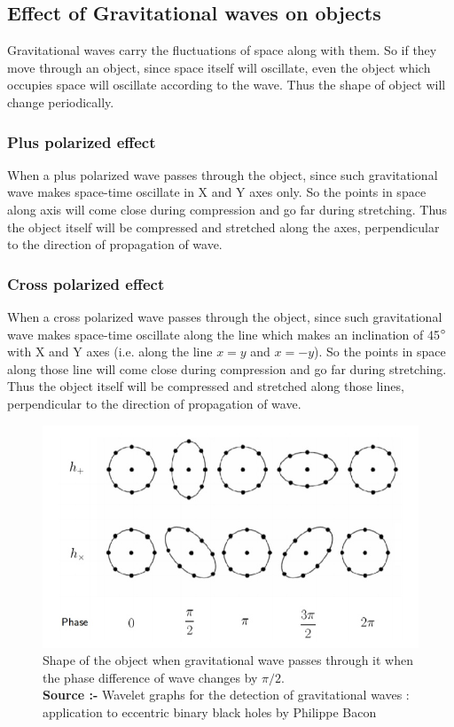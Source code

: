 \subsection{Effect of Gravitational waves on objects}

Gravitational waves carry the fluctuations of space along with them. So if they move through an object, since space itself will oscillate, even the object which occupies space will oscillate according to the wave. Thus the shape of object will change periodically.  

\subsubsection{Plus polarized effect}
When a plus polarized wave passes through the object, since such gravitational wave makes space-time oscillate in X and Y axes only. So the points in space along axis will come close during compression and go far during stretching. Thus the object itself will be compressed and stretched along the axes, perpendicular to the direction of propagation of wave.

\subsubsection{Cross polarized effect}
When a cross polarized wave passes through the object, since such gravitational wave makes space-time oscillate along the line which makes an inclination of 45$\degree$ with X and Y axes (i.e. along the line $x=y$ and $x=-y$). So the points in space along those line will come close during compression and go far during stretching. Thus the object itself will be compressed and stretched along those lines, perpendicular to the direction of propagation of wave.
\\

\begin{figure}[h]
    \centering
    \includegraphics[scale=0.42]{images.tex/effect_of_gw.jpeg}
    \caption{Shape of the object when gravitational wave passes through it when the phase difference of wave changes by $\pi/2$.\\
    \textbf{Source :-} Wavelet graphs for the detection of gravitational waves : application to eccentric binary black holes by Philippe Bacon}
\end{figure}

